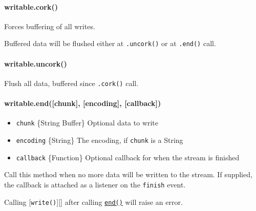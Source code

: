 \paragraph{writable.cork()}

Forces buffering of all writes.

Buffered data will be flushed either at \texttt{.uncork()} or at
\texttt{.end()} call.

\paragraph{writable.uncork()}

Flush all data, buffered since \texttt{.cork()} call.

\paragraph{writable.end({[}chunk{]}, {[}encoding{]}, {[}callback{]})}

\begin{itemize}
\item
  \texttt{chunk} \{String \textbar{} Buffer\} Optional data to write
\item
  \texttt{encoding} \{String\} The encoding, if \texttt{chunk} is a
  String
\item
  \texttt{callback} \{Function\} Optional callback for when the stream
  is finished
\end{itemize}

Call this method when no more data will be written to the stream. If
supplied, the callback is attached as a listener on the \texttt{finish}
event.

Calling {[}\texttt{write()}{]}{[}{]} after calling
\hyperref[stream\_writable\_end\_chunk\_encoding\_callback]{\texttt{end()}}
will raise an error.

\begin{Shaded}
\begin{Highlighting}[]
\NormalTok{(} 
  \NormalTok{(}\NormalTok{);}
  \NormalTok{(}\NormalTok{);}
\NormalTok{\});}
\end{Highlighting}
\end{Shaded}

